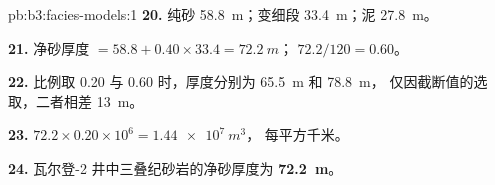 \begin{solution}{pb:b3:facies-models:1}
\textbf{20.} 纯砂 \qty{58.8}{m}；变细段 \qty{33.4}{m}；泥
\qty{27.8}{m}。

\textbf{21.} 净砂厚度 $= 58.8 + 0.40\times33.4 = \qty{72.2}{m}$；
$72.2/120 = 0.60$。

\textbf{22.} 比例取 0.20 与 0.60 时，厚度分别为 \qty{65.5}{m} 和 \qty{78.8}{m}，
仅因截断值的选取，二者相差 \qty{13}{m}。

\textbf{23.} $72.2\times0.20\times10^6 = \qty{1.44e7}{m^3}$，
每平方千米。

\textbf{24.} 瓦尔登-2 井中三叠纪砂岩的净砂厚度为
\textbf{\qty[text-series-to-math=true]{72.2}{m}}。
\end{solution}
